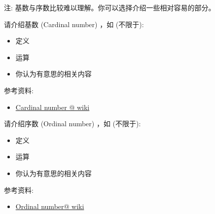 \documentclass[a4paper, justified]{tufte-handout}
\begin{document}
\begin{solution}
\end{solution}

\beginot

注: 基数与序数比较难以理解。你可以选择介绍一些相对容易的部分。
\begin{ot}[基数]
  请介绍基数 (Cardinal number) ，如 (不限于):
  \begin{itemize}
    \item 定义 
    \item 运算
    \item 你认为有意思的相关内容
  \end{itemize}

  \noindent 参考资料:
  \begin{itemize}
    \item \href{https://en.wikipedia.org/wiki/Cardinal\_number}{Cardinal number @ wiki}
  \end{itemize}
\end{ot}

\vspace{0.50cm}
\begin{ot}[序数]
  请介绍序数 (Ordinal number) ，如 (不限于):
  \begin{itemize}
    \item 定义 
    \item 运算
    \item 你认为有意思的相关内容
  \end{itemize}

  \noindent 参考资料:
  \begin{itemize}
    \item \href{https://en.wikipedia.org/wiki/Ordinal\_number}{Ordinal number@ wiki}
  \end{itemize}
\end{ot}



\begincorrection


\beginfb

\end{document}
